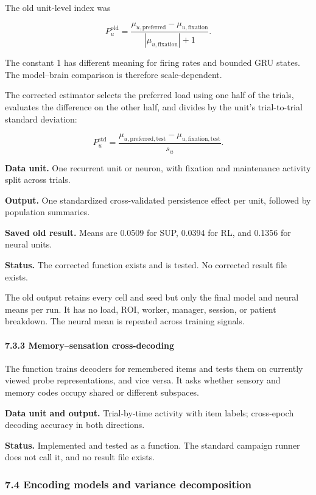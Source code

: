 \documentclass[
  10pt,
]{article}
\begin{document}
The old unit-level index was

\[
P_u^{\mathrm{old}}
=
\frac{
\mu_{u,\mathrm{preferred}}-\mu_{u,\mathrm{fixation}}
}{
|\mu_{u,\mathrm{fixation}}|+1
}.
\]

The constant 1 has different meaning for firing rates and bounded GRU
states. The model--brain comparison is therefore scale-dependent.

The corrected estimator selects the preferred load using one half of the
trials, evaluates the difference on the other half, and divides by the
unit's trial-to-trial standard deviation:

\[
P_u^{\mathrm{std}}
=
\frac{
\mu_{u,\mathrm{preferred,test}}
-\mu_{u,\mathrm{fixation,test}}
}{s_u}.
\]

\textbf{Data unit.} One recurrent unit or neuron, with fixation and
maintenance activity split across trials.

\textbf{Output.} One standardized cross-validated persistence effect per
unit, followed by population summaries.

\textbf{Saved old result.} Means are 0.0509 for SUP, 0.0394 for RL, and
0.1356 for neural units.

\textbf{Status.} The corrected function exists and is tested. No
corrected result file exists.

The old output retains every cell and seed but only the final model and
neural means per run. It has no load, ROI, worker, manager, session, or
patient breakdown. The neural mean is repeated across training signals.

\hypertarget{memorysensation-cross-decoding}{%
\paragraph{7.3.3 Memory--sensation
cross-decoding}\label{memorysensation-cross-decoding}}

The function trains decoders for remembered items and tests them on
currently viewed probe representations, and vice versa. It asks whether
sensory and memory codes occupy shared or different subspaces.

\textbf{Data unit and output.} Trial-by-time activity with item labels;
cross-epoch decoding accuracy in both directions.

\textbf{Status.} Implemented and tested as a function. The standard
campaign runner does not call it, and no result file exists.

\hypertarget{encoding-models-and-variance-decomposition}{%
\subsubsection{7.4 Encoding models and variance
decomposition}\label{encoding-models-and-variance-decomposition}}
\end{document}
